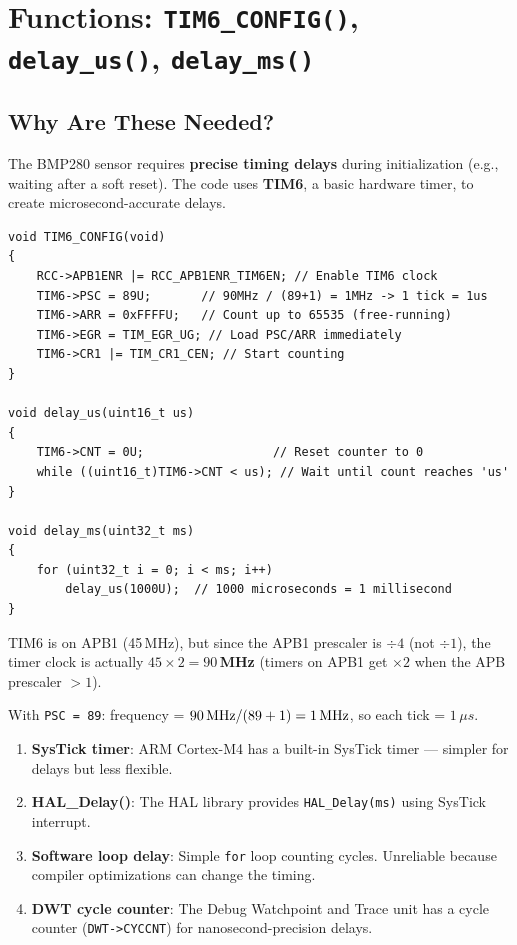 \documentclass[12pt, a4paper]{article}
\begin{document}
\section{Functions: \texttt{TIM6\_CONFIG()}, \texttt{delay\_us()}, \texttt{delay\_ms()}}

\subsection{Why Are These Needed?}

The BMP280 sensor requires \textbf{precise timing delays} during initialization (e.g., waiting after a soft reset). The code uses \textbf{TIM6}, a basic hardware timer, to create microsecond-accurate delays.

\begin{codebox}
\begin{lstlisting}[style=CStyle]
void TIM6_CONFIG(void)
{
    RCC->APB1ENR |= RCC_APB1ENR_TIM6EN; // Enable TIM6 clock
    TIM6->PSC = 89U;       // 90MHz / (89+1) = 1MHz -> 1 tick = 1us
    TIM6->ARR = 0xFFFFU;   // Count up to 65535 (free-running)
    TIM6->EGR = TIM_EGR_UG; // Load PSC/ARR immediately
    TIM6->CR1 |= TIM_CR1_CEN; // Start counting
}

void delay_us(uint16_t us)
{
    TIM6->CNT = 0U;                  // Reset counter to 0
    while ((uint16_t)TIM6->CNT < us); // Wait until count reaches 'us'
}

void delay_ms(uint32_t ms)
{
    for (uint32_t i = 0; i < ms; i++)
        delay_us(1000U);  // 1000 microseconds = 1 millisecond
}
\end{lstlisting}
\end{codebox}

\begin{tipbox}
TIM6 is on APB1 (45\,MHz), but since the APB1 prescaler is $\div 4$ (not $\div 1$), the timer clock is actually \textbf{$45 \times 2 = 90$\,MHz} (timers on APB1 get $\times 2$ when the APB prescaler $> 1$).

With \texttt{PSC = 89}: frequency = $90\text{\,MHz} / (89+1) = 1\text{\,MHz}$, so each tick = $1\,\mu s$.
\end{tipbox}

\begin{altbox}
\begin{enumerate}[leftmargin=2em]
    \item \textbf{SysTick timer}: ARM Cortex-M4 has a built-in SysTick timer --- simpler for delays but less flexible.
    \item \textbf{HAL\_Delay()}: The HAL library provides \texttt{HAL\_Delay(ms)} using SysTick interrupt.
    \item \textbf{Software loop delay}: Simple \texttt{for} loop counting cycles. Unreliable because compiler optimizations can change the timing.
    \item \textbf{DWT cycle counter}: The Debug Watchpoint and Trace unit has a cycle counter (\texttt{DWT->CYCCNT}) for nanosecond-precision delays.
\end{enumerate}
\end{altbox}
\end{document}
